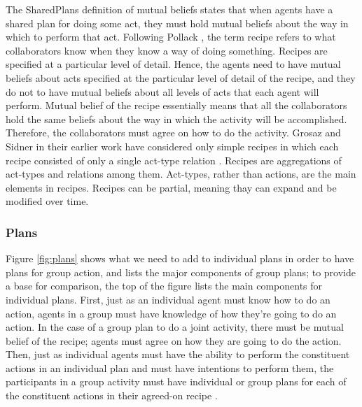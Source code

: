 \documentclass[11pt]{article}
\begin{document}
The SharedPlans definition of mutual beliefs states that when agents have a
shared plan for doing some act, they must hold mutual beliefs about the way in
which to perform that act. Following Pollack
\cite{pollack:plan-mental-attitudes}, the term recipe refers to what
collaborators know when they know a way of doing something. Recipes are
specified at a particular level of detail. Hence, the agents need to have mutual
beliefs about acts specified at the particular level of detail of the recipe,
and they do not to have mutual beliefs about all levels of acts that each agent
will perform. Mutual belief of the recipe essentially means that all the
collaborators hold the same beliefs about the way in which the activity will be
accomplished. Therefore, the collaborators must agree on how to do the activity.
Grosaz and Sidner in their earlier work \cite{grosz:plans-discourse} have
considered only simple recipes in which each recipe consisted of only a single
act-type relation \cite{lochbaum:plan-models}. Recipes are aggregations of
act-types and relations among them. Act-types, rather than actions, are the main
elements in recipes. Recipes can be partial, meaning thay can expand and be
modified over time.

\subsubsection{Plans}

Figure \ref{fig:plans} shows what we need to add to individual plans in order to
have plans for group action, and lists the major components of group plans; to
provide a base for comparison, the top of the figure lists the main components
for individual plans. First, just as an individual agent must know how to do an
action, agents in a group must have knowledge of how they’re going to do an
action. In the case of a group plan to do a joint activity, there must be mutual
belief of the recipe; agents must agree on how they are going to do the action.
Then, just as individual agents must have the ability to perform the constituent
actions in an individual plan and must have intentions to perform them, the
participants in a group activity must have individual or group plans for each of
the constituent actions in their agreed-on recipe \cite{grosz:plans-discourse}
\cite{grosz:collaborative-systems}.
\end{document}
